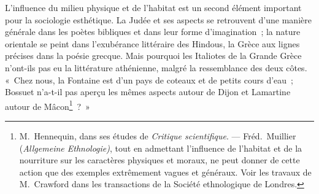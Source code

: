 \documentclass[french,twoside]{book} %
\begin{document}
L’influence du milieu physique et de l’habitat est un second élément important pour la sociologie esthétique. La Judée et ses aspects se retrouvent d’une manière générale dans les poètes bibliques et dans leur forme d’imagination ; la nature orientale se peint dans l’exubérance littéraire des Hindous, la Grèce aux lignes précises dans la poésie grecque. Mais pourquoi les Italiotes de la Grande Grèce n’ont-ils pas eu la littérature athénienne, malgré la ressemblance des deux côtes. « Chez nous, la Fontaine est d’un pays de coteaux et de petits cours d’eau ; Bossuet n’a-t-il pas aperçu les mêmes aspects autour de Dijon et Lamartine autour de Mâcon\footnote{ M. Hennequin, dans ses études de \emph{Critique scientifique}. — Fréd. Muillier (\emph{Allgemeine Ethnologie)}, tout en admettant l’influence de l’habitat et de la nourriture sur les caractères physiques et moraux, ne peut donner de cette action que des exemples extrêmement vagues et généraux. Voir les travaux de M. Crawford dans les transactions de la Société ethnologique de Londres.} ? »\par
\end{document}
